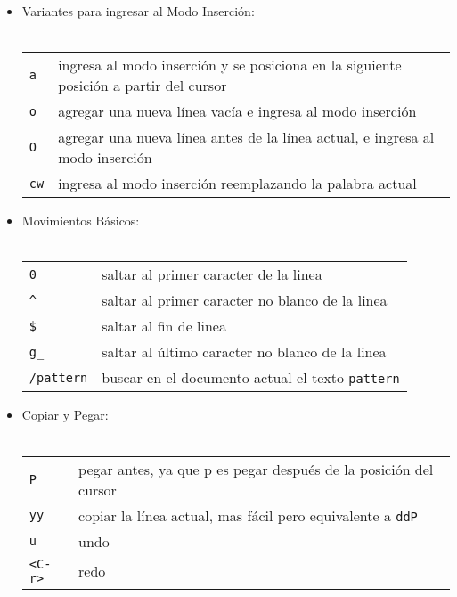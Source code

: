 \documentclass[12pt]{article}
\begin{document}
\begin{itemize}
	\item Variantes para ingresar al Modo Inserción: \\ \\
\begin{tabular}{ l l }
            \texttt{a} & ingresa al modo inserción y se posiciona en la siguiente posición a partir del cursor \\
            \texttt{o} & agregar una nueva línea vacía e ingresa al modo inserción \\
            \texttt{O} & agregar una nueva línea antes de la línea actual, e ingresa al modo inserción \\
            \texttt{cw} & ingresa al modo inserción reemplazando la palabra actual \\
\end{tabular}
\end{itemize}



\begin{itemize}
	\item Movimientos Básicos: \\ \\
\begin{tabular}{ l l }
            \texttt{0} & saltar al primer caracter de la linea \\
            \texttt{\^} & saltar al primer caracter no blanco de la linea \\
            \texttt{\$} & saltar al fin de linea \\
            \texttt{g\_} & saltar al último caracter no blanco de la linea \\
            \texttt{/pattern} & buscar en el documento actual el texto \texttt{pattern} \\
\end{tabular}
\end{itemize}



\begin{itemize}
	\item Copiar y Pegar: \\ \\
\begin{tabular}{ l l }
            \texttt{P} & pegar antes, ya que p es pegar después de la posición del cursor \\
            \texttt{yy} & copiar la línea actual, mas fácil pero equivalente a \texttt{ddP} \\
            \texttt{u} & undo \\
            \texttt{<C-r>} & redo \\
\end{tabular}
\end{itemize}
\end{document}
